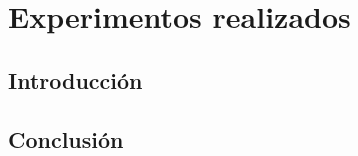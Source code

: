 
\chapter{Experimentos realizados}

\label{chap6:evaluaci=0000F3n}

\section{Introducción}

\section{Conclusión}
